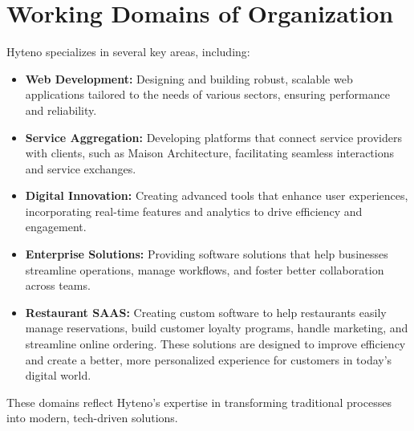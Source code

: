 \section{Working Domains of Organization}
Hyteno specializes in several key areas, including:
\begin{itemize}
  \item \textbf{Web Development:} Designing and building robust, scalable web applications tailored to the needs of various sectors, ensuring performance and reliability.
  \item \textbf{Service Aggregation:} Developing platforms that connect service providers with clients, such as Maison Architecture, facilitating seamless interactions and service exchanges.
  \item \textbf{Digital Innovation:} Creating advanced tools that enhance user experiences, incorporating real-time features and analytics to drive efficiency and engagement.
  \item \textbf{Enterprise Solutions:} Providing software solutions that help businesses streamline operations, manage workflows, and foster better collaboration across teams.
  \item \textbf{Restaurant SAAS:} Creating custom software to help restaurants easily manage reservations, build customer loyalty programs, handle marketing, and streamline online ordering. These solutions are designed to improve efficiency and create a better, more personalized experience for customers in today’s digital world.
\end{itemize}
These domains reflect Hyteno's expertise in transforming traditional processes into modern, tech-driven solutions.
